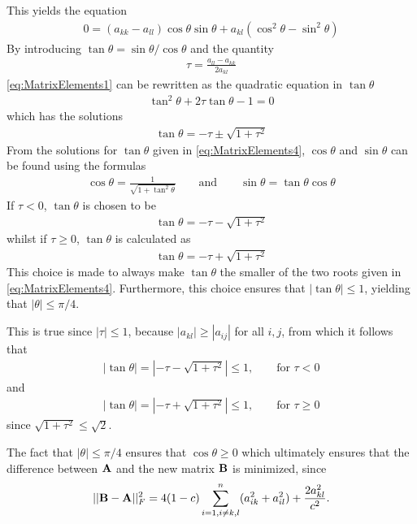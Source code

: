 This yields the equation
\begin{align}
	0 = (a_{kk} - a_{ll} ) \cos \theta \sin \theta + a_{kl} (\cos ^2 \theta - \sin ^2 \theta )
	\label{eq:MatrixElements1}
\end{align}
By introducing $\tan \theta = \sin \theta / \cos \theta$ and the quantity
\begin{align}
	\tau = \frac{a_{ll}-a_{kk}}{2a_{kl}}
	\label{eq:MatrixElements2}
\end{align}
\eqref{eq:MatrixElements1} can be rewritten as the quadratic equation in $\tan \theta$
\begin{align}
	\tan ^2 \theta + 2 \tau \tan \theta - 1 = 0
	\label{eq:MatrixElements3}
\end{align}
which has the solutions
\begin{align}
	\tan \theta = -\tau \pm \sqrt{1 + \tau ^2}
	\label{eq:MatrixElements4}
\end{align}
From the solutions for $\tan \theta$ given in \eqref{eq:MatrixElements4}, $\cos \theta$ and $\sin \theta$ can be found using the formulas 
\begin{align*}
	\cos \theta = \frac{1}{\sqrt{1+\tan ^2 \theta}} \qquad \text{and} \qquad \sin \theta = \tan \theta \cos \theta
\end{align*}
If $\tau < 0$, $\tan \theta$ is chosen to be
\begin{align}
	\tan \theta = -\tau - \sqrt{1 + \tau ^2}
	\label{eq:MatrixElements5}
\end{align}
whilst if $\tau \geq 0$, $\tan \theta$ is calculated as
\begin{align}
	\tan \theta = -\tau + \sqrt{1 + \tau ^2}
	\label{eq:MatrixElements6}
\end{align}
This choice is made to always make $\tan \theta$ the smaller of the two roots given in \eqref{eq:MatrixElements4}.
Furthermore, this choice ensures that $|\tan \theta | \leq 1$, yielding that $|\theta| \leq \pi/4$.

This is true since $|\tau| \leq 1$, because $|a_{kl}| \geq |a_{ij}|$ for all $i, j$, from which it follows that
\begin{align}
	|\tan \theta| = \left|-\tau - \sqrt{1 + \tau ^2}\right| 
	\leq 1 , \qquad \text{for } \tau < 0
\end{align}   
and
\begin{align}
	|\tan \theta| = \left|-\tau + \sqrt{1 + \tau ^2}\right|
	\leq 1 , \qquad \text{for } \tau \geq 0
\end{align} 
since $\sqrt{1+\tau^2} \leq \sqrt{2}$.

The fact that $|\theta| \leq \pi/4$ ensures that $\cos \theta \geq 0$ which ultimately ensures that the difference between $\mbox{\textbf{A}}$ and the new matrix $\mbox{\textbf{B}}$ is minimized, since
\begin{align}
	||\mbox{\textbf{B}}-\mbox{\textbf{A}}||_F^2=4(1-c)\sum_{i=1,i\ne k,l}^n(a_{ik}^2+a_{il}^2) +\frac{2a_{kl}^2}{c^2}.
\end{align}
